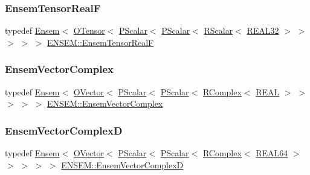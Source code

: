 \mbox{\label{group__defs_ga0da81ce50f4b2ae81c1190e8e266480c}} 
\subsubsection{\texorpdfstring{EnsemTensorRealF}{EnsemTensorRealF}}
{\footnotesize\ttfamily typedef \mbox{\hyperlink{classENSEM_1_1Ensem}{Ensem}}$<$ \mbox{\hyperlink{classENSEM_1_1OTensor}{O\+Tensor}}$<$ \mbox{\hyperlink{classENSEM_1_1PScalar}{P\+Scalar}}$<$ \mbox{\hyperlink{classENSEM_1_1PScalar}{P\+Scalar}}$<$ \mbox{\hyperlink{classENSEM_1_1RScalar}{R\+Scalar}}$<$ \mbox{\hyperlink{namespaceENSEM_a7540d01191172323e9073283d772576d}{R\+E\+A\+L32}} $>$ $>$ $>$ $>$ $>$ \mbox{\hyperlink{group__defs_ga0da81ce50f4b2ae81c1190e8e266480c}{E\+N\+S\+E\+M\+::\+Ensem\+Tensor\+RealF}}}

\mbox{\label{group__defs_ga13b984332760feb8bc9c8f1071ade9ef}} 
\subsubsection{\texorpdfstring{EnsemVectorComplex}{EnsemVectorComplex}}
{\footnotesize\ttfamily typedef \mbox{\hyperlink{classENSEM_1_1Ensem}{Ensem}}$<$ \mbox{\hyperlink{classENSEM_1_1OVector}{O\+Vector}}$<$ \mbox{\hyperlink{classENSEM_1_1PScalar}{P\+Scalar}}$<$ \mbox{\hyperlink{classENSEM_1_1PScalar}{P\+Scalar}}$<$ \mbox{\hyperlink{classENSEM_1_1RComplex}{R\+Complex}}$<$ \mbox{\hyperlink{namespaceENSEM_a6dd9aa6508168f545c861787e63ddd1e}{R\+E\+AL}} $>$ $>$ $>$ $>$ $>$ \mbox{\hyperlink{group__defs_ga13b984332760feb8bc9c8f1071ade9ef}{E\+N\+S\+E\+M\+::\+Ensem\+Vector\+Complex}}}

\mbox{\label{group__defs_gaaee70d31501194625b4827518c28934c}} 
\subsubsection{\texorpdfstring{EnsemVectorComplexD}{EnsemVectorComplexD}}
{\footnotesize\ttfamily typedef \mbox{\hyperlink{classENSEM_1_1Ensem}{Ensem}}$<$ \mbox{\hyperlink{classENSEM_1_1OVector}{O\+Vector}}$<$ \mbox{\hyperlink{classENSEM_1_1PScalar}{P\+Scalar}}$<$ \mbox{\hyperlink{classENSEM_1_1PScalar}{P\+Scalar}}$<$ \mbox{\hyperlink{classENSEM_1_1RComplex}{R\+Complex}}$<$ \mbox{\hyperlink{namespaceENSEM_a85b215b9f1f43715aebee01718e25082}{R\+E\+A\+L64}} $>$ $>$ $>$ $>$ $>$ \mbox{\hyperlink{group__defs_gaaee70d31501194625b4827518c28934c}{E\+N\+S\+E\+M\+::\+Ensem\+Vector\+ComplexD}}}

